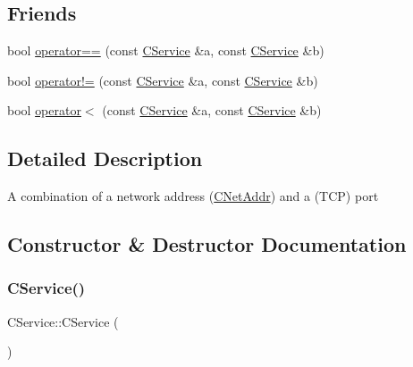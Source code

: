 \subsection*{Friends}
\begin{DoxyCompactItemize}
\item 
bool \mbox{\hyperlink{class_c_service_a7abc2516fa7e015cafcf9b98bc33e2ea}{operator==}} (const \mbox{\hyperlink{class_c_service}{C\+Service}} \&a, const \mbox{\hyperlink{class_c_service}{C\+Service}} \&b)
\item 
bool \mbox{\hyperlink{class_c_service_a5834e0ab5104fffac621ea53fa2c3860}{operator!=}} (const \mbox{\hyperlink{class_c_service}{C\+Service}} \&a, const \mbox{\hyperlink{class_c_service}{C\+Service}} \&b)
\item 
bool \mbox{\hyperlink{class_c_service_a26d0e22a8e7ae213b25467da3556c9e4}{operator$<$}} (const \mbox{\hyperlink{class_c_service}{C\+Service}} \&a, const \mbox{\hyperlink{class_c_service}{C\+Service}} \&b)
\end{DoxyCompactItemize}


\subsection{Detailed Description}
A combination of a network address (\mbox{\hyperlink{class_c_net_addr}{C\+Net\+Addr}}) and a (T\+CP) port 

\subsection{Constructor \& Destructor Documentation}
\mbox{\label{class_c_service_a3003da1c50f2135123ebb3109340b9b2}} 
\subsubsection{\texorpdfstring{C\+Service()}{CService()}\hspace{0.1cm}{\footnotesize\ttfamily [1/10]}}
{\footnotesize\ttfamily C\+Service\+::\+C\+Service (\begin{DoxyParamCaption}{ }\end{DoxyParamCaption})}

\mbox{\label{class_c_service_a43a0d18387ce3837d48020da47a1087c}} 
